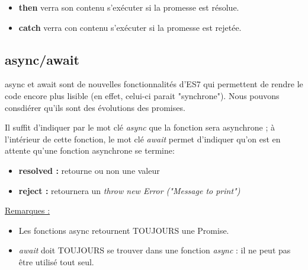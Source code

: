 \documentclass[a4paper,10pt]{article}
\begin{document}
\begin{itemize}
    \item \textbf{then} verra son contenu s'exécuter si la promesse est résolue.
    \item \textbf{catch} verra con contenu s'exécuter si la promesse est rejetée.
\end{itemize}

\subsection{async/await}
async et await sont de nouvelles fonctionnalités d'ES7 qui permettent de rendre le code encore plus lisible (en effet, celui-ci parait "synchrone"). Nous pouvons consdiérer qu'ils sont des évolutions des promises.

Il suffit d'indiquer par le mot clé \emph{async} que la fonction sera asynchrone ; à l'intérieur de cette fonction, le mot clé \emph{await} permet d'indiquer qu'on est en attente qu'une fonction asynchrone se termine: 
\begin{itemize}
    \item \textbf{resolved :} retourne ou non une valeur
    \item  \textbf{reject :} retournera un \emph{throw new Error ("Message to print")}
    
\end{itemize}




\underline{Remarques :}
\begin{itemize}
    \item Les fonctions async retournent TOUJOURS une Promise.
    \item \emph{await} doit TOUJOURS se trouver dans une fonction \emph{async} : il ne peut pas être utilisé tout seul.
    
\end{itemize}
\end{document}
